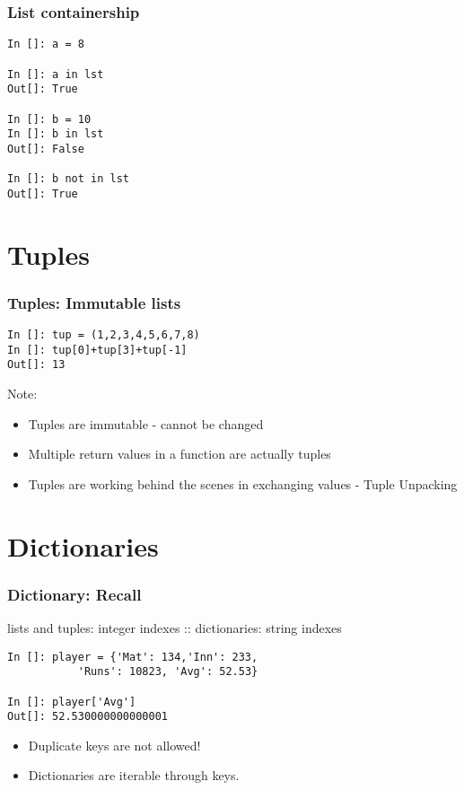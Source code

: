 \documentclass[14pt,compress]{beamer}
\newcounter{time}
\newcommand{\inctime}[1]{\addtocounter{time}{#1}{\tiny \thetime\ m}}
\begin{document}
\begin{frame}[fragile]
\frametitle{List containership}
\begin{lstlisting}
In []: a = 8

In []: a in lst
Out[]: True

In []: b = 10
In []: b in lst
Out[]: False

In []: b not in lst
Out[]: True
\end{lstlisting}
\inctime{10}
\end{frame}

\section{Tuples}
\begin{frame}[fragile]
\frametitle{Tuples: Immutable lists}
\begin{lstlisting}
In []: tup = (1,2,3,4,5,6,7,8)
In []: tup[0]+tup[3]+tup[-1]
Out[]: 13
\end{lstlisting}
\begin{block}{Note:}
\begin{itemize}
\item Tuples are immutable - cannot be changed
\item Multiple return values in a function are actually tuples
\item Tuples are working behind the scenes in exchanging values - Tuple Unpacking
\end{itemize}
\end{block}
\inctime{5}
\end{frame}

\section{Dictionaries}
\begin{frame}[fragile]
\frametitle{Dictionary: Recall}
  \alert {lists and tuples: integer indexes :: dictionaries: string indexes}
\begin{lstlisting}
In []: player = {'Mat': 134,'Inn': 233, 
           'Runs': 10823, 'Avg': 52.53}

In []: player['Avg']
Out[]: 52.530000000000001
\end{lstlisting}
\begin{itemize}
\item Duplicate keys are not allowed!
\item Dictionaries are iterable through keys.
\end{itemize}
\end{frame}
\end{document}
